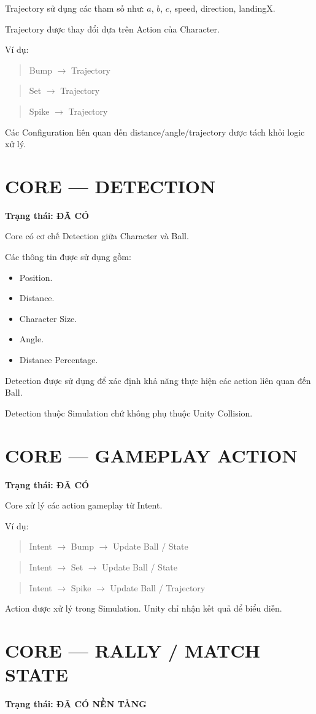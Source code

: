 \documentclass[12pt,a4paper]{article}
\newcommand{\flow}[1]{%
  \begin{quote}\centering\ttfamily #1\end{quote}%
}
\begin{document}
Trajectory sử dụng các tham số như: $a$, $b$, $c$, speed, direction, landingX.

Trajectory được thay đổi dựa trên Action của Character.

Ví dụ:

\flow{Bump $\rightarrow$ Trajectory}
\flow{Set $\rightarrow$ Trajectory}
\flow{Spike $\rightarrow$ Trajectory}

Các Configuration liên quan đến distance/angle/trajectory được tách khỏi logic xử lý.

\section{CORE --- DETECTION}
\textbf{Trạng thái: ĐÃ CÓ}

Core có cơ chế Detection giữa Character và Ball.

Các thông tin được sử dụng gồm:
\begin{itemize}[nosep]
  \item Position.
  \item Distance.
  \item Character Size.
  \item Angle.
  \item Distance Percentage.
\end{itemize}

Detection được sử dụng để xác định khả năng thực hiện các action liên quan đến Ball.

Detection thuộc Simulation chứ không phụ thuộc Unity Collision.

\section{CORE --- GAMEPLAY ACTION}
\textbf{Trạng thái: ĐÃ CÓ}

Core xử lý các action gameplay từ Intent.

Ví dụ:

\flow{Intent $\rightarrow$ Bump $\rightarrow$ Update Ball / State}
\flow{Intent $\rightarrow$ Set $\rightarrow$ Update Ball / State}
\flow{Intent $\rightarrow$ Spike $\rightarrow$ Update Ball / Trajectory}

Action được xử lý trong Simulation. Unity chỉ nhận kết quả để biểu diễn.

\section{CORE --- RALLY / MATCH STATE}
\textbf{Trạng thái: ĐÃ CÓ NỀN TẢNG}
\end{document}

